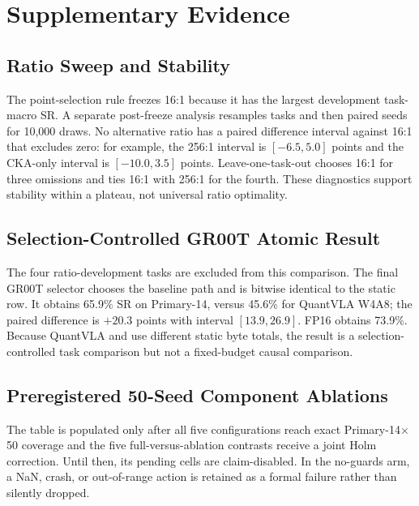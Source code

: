 \section{Supplementary Evidence}
\label{sec:supplement}

\subsection{Ratio Sweep and Stability}



The point-selection rule freezes 16:1 because it has the largest development task-macro SR. A separate post-freeze analysis resamples tasks and then paired seeds for 10,000 draws. No alternative ratio has a paired difference interval against 16:1 that excludes zero: for example, the 256:1 interval is $[-6.5,5.0]$ points and the CKA-only interval is $[-10.0,3.5]$ points. Leave-one-task-out chooses 16:1 for three omissions and ties 16:1 with 256:1 for the fourth. These diagnostics support stability within a plateau, not universal ratio optimality.

\subsection{Selection-Controlled GR00T Atomic Result}



The four ratio-development tasks are excluded from this comparison. The final GR00T selector chooses the baseline path and is bitwise identical to the static \method row. It obtains 65.9\% SR on Primary-14, versus 45.6\% for QuantVLA W4A8; the paired difference is $+20.3$ points with interval $[13.9,26.9]$. FP16 obtains 73.9\%. Because QuantVLA and \method use different static byte totals, the result is a selection-controlled task comparison but not a fixed-budget causal comparison.

\subsection{Preregistered 50-Seed Component Ablations}



The table is populated only after all five configurations reach exact Primary-14$\times$50 coverage and the five full-versus-ablation contrasts receive a joint Holm correction. Until then, its pending cells are claim-disabled. In the no-guards arm, a NaN, crash, or out-of-range action is retained as a formal failure rather than silently dropped.


